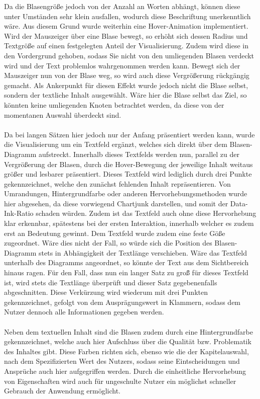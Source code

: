 Da die Blasengr\"o{\ss}e jedoch von der Anzahl an Worten abh\"angt, k\"onnen diese unter Umst\"anden sehr klein ausfallen, wodurch diese Beschriftung unerkenntlich w\"are. Aus diesem Grund wurde weiterhin eine Hover-Animation implementiert. Wird der Mauszeiger \"uber eine Blase bewegt, so erh\"oht sich dessen Radius und Textgr\"o{\ss}e auf einen festgelegten Anteil der Visualisierung. Zudem wird diese in den Vordergrund gehoben, sodass Sie nicht von den umliegenden Blasen verdeckt wird und der Text problemlos wahrgenommen werden kann. Bewegt sich der Mauszeiger nun von der Blase weg, so wird auch diese Vergr\"o{\ss}erung r\"uckg\"angig gemacht. Als Ankerpunkt f\"ur diesen Effekt wurde jedoch nicht die Blase selbst, sondern der textliche Inhalt ausgew\"ahlt. W\"are hier die Blase selbst das Ziel, so k\"onnten keine umliegenden Knoten betrachtet werden, da diese von der momentanen Auswahl \"uberdeckt sind.\\
\\
Da bei langen S\"atzen hier jedoch nur der Anfang pr\"asentiert werden kann, wurde die Visualisierung um ein Textfeld erg\"anzt, welches sich direkt \"uber dem Blasen-Diagramm aufstreckt. Innerhalb dieses Textfelds werden nun, parallel zu der Vergr\"o{\ss}erung der Blasen, durch die Hover-Bewegung der jeweilige Inhalt weitaus gr\"o{\ss}er und lesbarer pr\"asentiert. Dieses Textfeld wird lediglich durch drei Punkte gekennzeichnet, welche den zun\"achst fehlenden Inhalt repr\"asentieren. Von Umrandungen, Hintergrundfarbe oder anderen Hervorhebungsmethoden wurde hier abgesehen, da diese vorwiegend Chartjunk darstellen, und somit der Data-Ink-Ratio schaden w\"urden. Zudem ist das Textfeld auch ohne diese Hervorhebung klar erkennbar, sp\"atestens bei der ersten Interaktion, innerhalb welcher es zudem erst an Bedeutung gewinnt. Dem Textfeld wurde zudem eine feste G\"o{\ss}e zugeordnet. W\"are dies nicht der Fall, so w\"urde sich die Position des Blasen-Diagramm stets in Abh\"angigkeit der Textl\"ange verschieben. W\"are das Textfeld unterhalb des Diagramms angeordnet, so k\"onnte der Text aus dem Sichtbereich hinaus ragen. F\"ur den Fall, dass nun ein langer Satz zu gro\"{\ss} f\"ur dieses Textfeld ist, wird stets die Textl\"ange \"uberpr\"uft und dieser Satz gegebenenfalls abgeschnitten. Diese Verk\"urzung wird wiederum mit drei Punkten gekennzeichnet, gefolgt von dem Auspr\"agungswert in Klammern, sodass dem Nutzer dennoch alle Informationen gegeben werden.\\
\\
Neben dem textuellen Inhalt sind die Blasen zudem durch eine Hintergrundfarbe gekennzeichnet, welche auch hier Aufschluss \"uber die Qualit\"at bzw. Problematik des Inhaltes gibt. Diese Farben richten sich, ebenso wie die der Kapitelauswahl, nach dem Spezifizierten Wert des Nutzers, sodass seine Eintscheidungen und Anspr\"uche auch hier aufgegriffen werden. Durch die einheitliche Hervorhebung von Eigenschaften wird auch f\"ur ungeschulte Nutzer ein m\"oglichst schneller Gebrauch der Anwendung erm\"oglicht.\\

